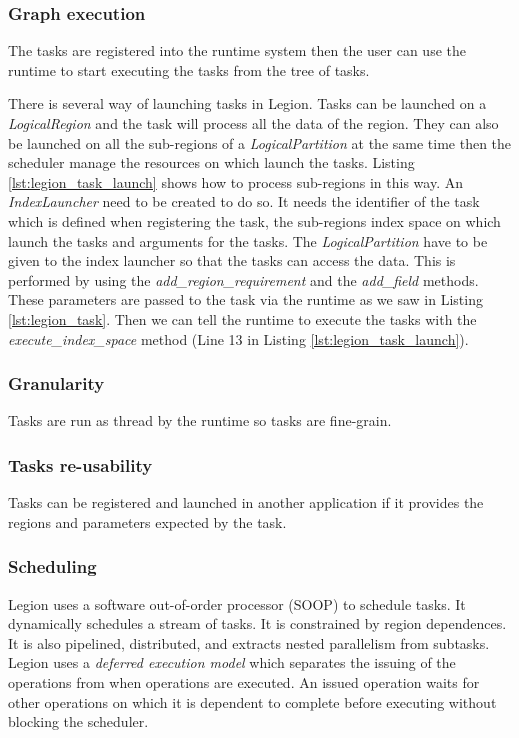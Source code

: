 \subsubsection{Graph execution}
The tasks are registered into the runtime system then the user can use the runtime to start executing the tasks from the tree of tasks.

\begin{figure}

\end{figure}

There is several way of launching tasks in Legion.
Tasks can be launched on a \textit{LogicalRegion} and  the task will process all the data of the region.
They can also be launched on all the sub-regions of a \textit{LogicalPartition} at the same time then the scheduler manage the resources on which launch the tasks.
Listing \ref{lst:legion_task_launch} shows how to process sub-regions in this way.
An \textit{IndexLauncher} need to be created to do so.
It needs the identifier of the task which is defined when registering the task, the sub-regions index space on which launch the tasks and arguments for the tasks.
The \textit{LogicalPartition} have to be given to the index launcher so that the tasks can access the data.
This is performed by using the \textit{add\_region\_requirement} and the \textit{add\_field} methods.
These parameters are passed to the task via the runtime as we saw in Listing \ref{lst:legion_task}.
Then we can tell the runtime to execute the tasks with the \textit{execute\_index\_space} method (Line 13 in Listing \ref{lst:legion_task_launch}).

\subsubsection{Granularity}
Tasks are run as thread by the runtime so tasks are fine-grain.

\subsubsection{Tasks re-usability}
Tasks can be registered and launched in another application if it provides the regions and parameters expected by the task.

\subsubsection{Scheduling}
Legion uses a software out-of-order processor (SOOP) to schedule tasks.
It dynamically schedules a stream of tasks.
It is constrained by region dependences.
It is also pipelined, distributed, and extracts nested parallelism from subtasks.
Legion uses a \textit{deferred execution model} which separates the issuing of the operations from when operations are executed.
An issued operation waits for other operations on which it is dependent to complete before executing without blocking the scheduler.

